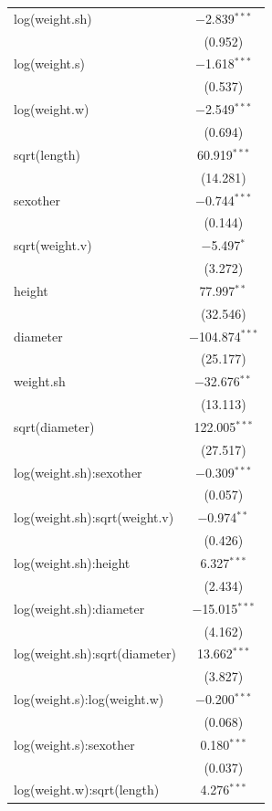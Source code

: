 \documentclass[12pt]{article}
\begin{document}
\begin{center}
\begin{longtable}{@{\extracolsep{5pt}}lc}
			log(weight.sh) & $-$2.839$^{***}$ \\ 
			& (0.952) \\[0.4ex]
			log(weight.s)  & $-$1.618$^{***}$ \\ 
			& (0.537) \\[0.4ex]
			log(weight.w)  & $-$2.549$^{***}$ \\ 
			& (0.694) \\[0.4ex]
			sqrt(length)   & 60.919$^{***}$ \\ 
			& (14.281) \\[0.4ex]
			sexother       & $-$0.744$^{***}$ \\ 
			& (0.144) \\[0.4ex]
			sqrt(weight.v) & $-$5.497$^{*}$ \\ 
			& (3.272) \\[0.4ex]
			height         & 77.997$^{**}$ \\ 
			& (32.546) \\[0.4ex]
			diameter       & $-$104.874$^{***}$ \\ 
			& (25.177) \\[0.4ex]
			weight.sh      & $-$32.676$^{**}$ \\ 
			& (13.113) \\[0.4ex]
			sqrt(diameter) & 122.005$^{***}$ \\ 
			& (27.517) \\[0.4ex]
			log(weight.sh):sexother & $-$0.309$^{***}$ \\ 
			& (0.057) \\[0.4ex]
			log(weight.sh):sqrt(weight.v) & $-$0.974$^{**}$ \\ 
			& (0.426) \\[0.4ex]
			log(weight.sh):height & 6.327$^{***}$ \\ 
			& (2.434) \\[0.4ex]
			log(weight.sh):diameter & $-$15.015$^{***}$ \\ 
			& (4.162) \\[0.4ex]
			log(weight.sh):sqrt(diameter) & 13.662$^{***}$ \\ 
			& (3.827) \\[0.4ex]
			log(weight.s):log(weight.w) & $-$0.200$^{***}$ \\ 
			& (0.068) \\[0.4ex]
			log(weight.s):sexother & 0.180$^{***}$ \\ 
			& (0.037) \\[0.4ex]
			log(weight.w):sqrt(length) & 4.276$^{***}$ \\ 

\end{longtable}
\end{center}
\end{document}
